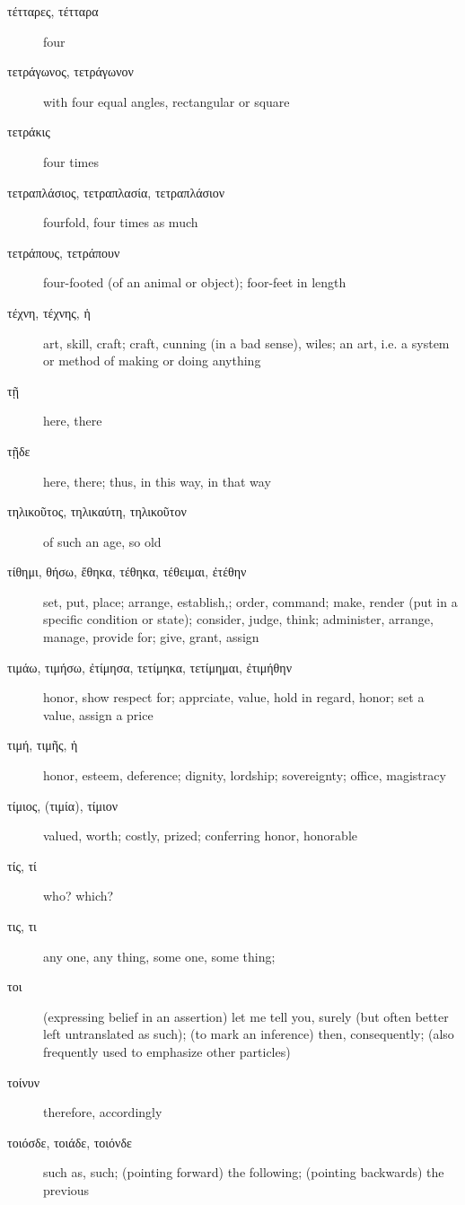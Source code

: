\documentclass[12pt,letterpaper]{article}
\begin{document}
\begin{description}
    \item[\textgreek{τέτταρες, τέτταρα}] \marginnote{*}four
    \item[\textgreek{τετράγωνος, τετράγωνον}] with four equal angles, rectangular or square
    \item[\textgreek{τετράκις}] four times
    \item[\textgreek{τετραπλάσιος, τετραπλασία, τετραπλάσιον}] fourfold, four times as much
    \item[\textgreek{τετράπους, τετράπουν}] four-footed (of an animal or object); foor-feet in length
    \item[\textgreek{τέχνη, τέχνης, ἡ}] \marginnote{*}art, skill, craft; craft, cunning (in a bad sense), wiles; an art, i.e. a system or method of making or doing anything
    \item[\textgreek{τῇ}] here, there
    \item[\textgreek{τῇδε}] here, there; thus, in this way, in that way
    \item[\textgreek{τηλικοῦτος, τηλικαύτη, τηλικοῦτον}] of such an age, so old
    \item[\textgreek{τίθημι, θήσω, ἔθηκα, τέθηκα, τέθειμαι, ἐτέθην}] \marginnote{*}set, put, place; arrange, establish,; order, command; make, render (put in a specific condition or state); consider, judge, think; administer, arrange, manage, provide for; give, grant, assign
    \item[\textgreek{τιμάω, τιμήσω, ἐτίμησα, τετίμηκα, τετίμημαι, ἐτιμήθην}] \marginnote{*}honor, show respect for; apprciate, value, hold in regard, honor; set a value, assign a price
    \item[\textgreek{τιμή, τιμῆς, ἡ}] \marginnote{*}honor, esteem, deference; dignity, lordship; sovereignty; office, magistracy
    \item[\textgreek{τίμιος, (τιμία), τίμιον}] valued, worth; costly, prized; conferring honor, honorable
    \item[\textgreek{τίς, τί}] \marginnote{*}who? which?
    \item[\textgreek{τις, τι}] \marginnote{*}any one, any thing, some one, some thing;
    \item[\textgreek{τοι}] \marginnote{*}(expressing belief in an assertion) let me tell you, surely (but often better left untranslated as such); (to mark an inference) then, consequently; (also frequently used to emphasize other particles)
    \item[\textgreek{τοίνυν}] \marginnote{*}therefore, accordingly
    \item[\textgreek{τοιόσδε, τοιάδε, τοιόνδε}] \marginnote{*}such as, such; (pointing forward) the following; (pointing backwards) the previous

\end{description}
\end{document}
